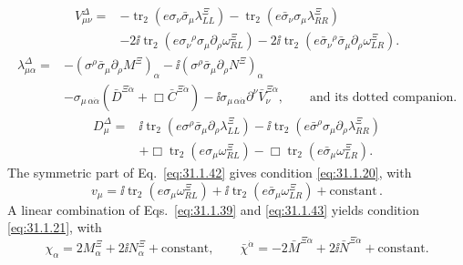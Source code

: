 \begin{equation}
  \begin{aligned}
  V_{\mu\nu}^\Delta
  ={}&-\operatorname{tr}_2
      (e\sigma_\nu\bar\sigma_\mu\lambda^\Xi_{LL})
     -\operatorname{tr}_2
      (e\bar\sigma_\nu\sigma_\mu\lambda^\Xi_{RR})\\
    &-2\ii\operatorname{tr}_2
      (e\sigma_{\nu}{}^\rho\sigma_\mu
       \partial_\rho\omega^\Xi_{RL})
     -2\ii\operatorname{tr}_2
      (e\bar\sigma_{\nu}{}^\rho\bar\sigma_\mu
       \partial_\rho\omega^\Xi_{LR}) .
  \end{aligned}
  \tag{31.1.42}\label{eq:31.1.42}
\end{equation}
\begin{equation}
  \begin{aligned}
  \lambda_{\mu\alpha}^\Delta
  ={}&-(\sigma^\rho\bar\sigma_\mu
       \partial_\rho M^\Xi)_\alpha
     -\ii(\sigma^\rho\bar\sigma_\mu
       \partial_\rho N^\Xi)_\alpha\\
    &-\sigma_{\mu\,\alpha\dot\alpha}
       (\bar D^{\Xi\dot\alpha}+\Box\bar C^{\Xi\dot\alpha})
     -\ii\sigma_{\mu\,\alpha\dot\alpha}
       \partial^\nu\bar V_\nu^{\Xi\dot\alpha},
  \qquad\text{and its dotted companion}.
  \end{aligned}
  \tag{31.1.43}\label{eq:31.1.43}
\end{equation}
\begin{equation}
  \begin{aligned}
  D_\mu^\Delta={}&
   \ii\operatorname{tr}_2(e\sigma^\rho\bar\sigma_\mu
      \partial_\rho\lambda^\Xi_{LL})
  -\ii\operatorname{tr}_2(e\bar\sigma^\rho\sigma_\mu
      \partial_\rho\lambda^\Xi_{RR})\\
  &+\Box\operatorname{tr}_2(e\sigma_\mu\omega^\Xi_{RL})
   -\Box\operatorname{tr}_2(e\bar\sigma_\mu\omega^\Xi_{LR}) .
  \end{aligned}
  \tag{31.1.44}\label{eq:31.1.44}
\end{equation}
The symmetric part of Eq.~\eqref{eq:31.1.42} gives condition
\eqref{eq:31.1.20}, with
\begin{equation}
  v_\mu=\ii\operatorname{tr}_2(e\sigma_\mu\omega^\Xi_{RL})
       +\ii\operatorname{tr}_2(e\bar\sigma_\mu\omega^\Xi_{LR})
       +\text{constant}\,.
  \tag{31.1.45}\label{eq:31.1.45}
\end{equation}
A linear combination of Eqs.~\eqref{eq:31.1.39} and
\eqref{eq:31.1.43} yields condition \eqref{eq:31.1.21}, with
\begin{equation}
  \chi_\alpha=2M_\alpha^\Xi+2\ii N_\alpha^\Xi+\text{constant},
  \qquad
  \bar\chi^{\dot\alpha}
  =-2\bar M^{\Xi\dot\alpha}
   +2\ii\bar N^{\Xi\dot\alpha}+\text{constant}.
  \tag{31.1.46}\label{eq:31.1.46}
\end{equation}
